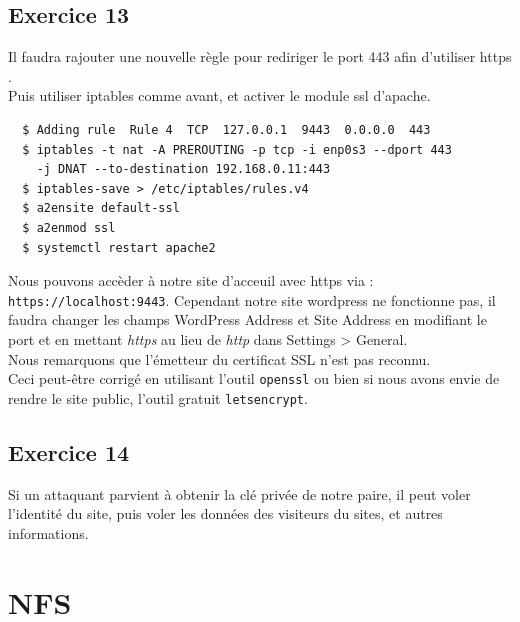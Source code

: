 \documentclass{report}
\begin{document}
\subsection{Exercice 13}
Il faudra rajouter une nouvelle règle pour rediriger le port 443 afin d'utiliser https .\\
Puis utiliser iptables comme avant, et activer le module ssl d'apache.
\begin{tcolorbox}
  \begin{verbatim}
  $ Adding rule  Rule 4  TCP  127.0.0.1  9443  0.0.0.0  443
  $ iptables -t nat -A PREROUTING -p tcp -i enp0s3 --dport 443
    -j DNAT --to-destination 192.168.0.11:443
  $ iptables-save > /etc/iptables/rules.v4
  $ a2ensite default-ssl
  $ a2enmod ssl
  $ systemctl restart apache2
  \end{verbatim}
\end{tcolorbox}
Nous pouvons accèder à notre site d'acceuil avec https via : \texttt{https://localhost:9443}.
Cependant notre site wordpress ne fonctionne pas, il faudra changer les champs WordPress Address
et Site Address en modifiant le port et en mettant \textit{https} au lieu de \textit{http} dans
Settings > General.\\
Nous remarquons que l'émetteur du certificat SSL n'est pas reconnu.\\
Ceci peut-être corrigé en utilisant l'outil \texttt{openssl} ou bien si nous avons envie de rendre le
site public, l'outil gratuit \texttt{letsencrypt}.

\subsection{Exercice 14}
Si un attaquant parvient à obtenir la clé privée de notre paire, il peut voler l'identité du site,
puis voler les données des visiteurs du sites, et autres informations.
\newpage
\section{NFS}
\end{document}
